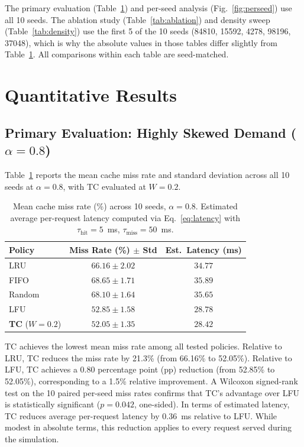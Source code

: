 \documentclass[preprint,12pt]{elsarticle}
\begin{document}
	The primary evaluation (Table~\ref{tab:main}) and per-seed analysis (Fig.~\ref{fig:perseed}) use all 10 seeds. The ablation study (Table~\ref{tab:ablation}) and density sweep (Table~\ref{tab:density}) use the first 5 of the 10 seeds (84810, 15592, 4278, 98196, 37048), which is why the absolute values in those tables differ slightly from Table~\ref{tab:main}. All comparisons within each table are seed-matched.
	
	\section{Quantitative Results}
	\label{sec:results}
	
	\subsection{Primary Evaluation: Highly Skewed Demand ($\alpha = 0.8$)}
	\label{sec:primary}
	
	Table~\ref{tab:main} reports the mean cache miss rate and standard deviation across all 10 seeds at $\alpha = 0.8$, with TC evaluated at $W = 0.2$.
	
	\begin{table}[t]
		\centering
		\renewcommand{\arraystretch}{1.1}
		\caption{Mean cache miss rate (\%) across 10 seeds, $\alpha = 0.8$. Estimated average per-request latency computed via Eq.~\ref{eq:latency} with $\tau_\text{hit} = 5$~ms, $\tau_\text{miss} = 50$~ms.}
		\label{tab:main}
		\begin{tabular}{lcc}
			\toprule
			\textbf{Policy} & \textbf{Miss Rate (\%) $\pm$ Std} & \textbf{Est.\ Latency (ms)} \\
			\midrule
			LRU & $66.16 \pm 2.02$ & $34.77$ \\
			FIFO & $68.65 \pm 1.71$ & $35.89$ \\
			Random & $68.10 \pm 1.64$ & $35.65$ \\
			LFU & $52.85 \pm 1.58$ & $28.78$ \\
			\textbf{TC} ($W=0.2$) & $\mathbf{52.05 \pm 1.35}$ & $\mathbf{28.42}$ \\
			\bottomrule
		\end{tabular}
	\end{table}
	
	TC achieves the lowest mean miss rate among all tested policies. Relative to LRU, TC reduces the miss rate by 21.3\% (from 66.16\% to 52.05\%). Relative to LFU, TC achieves a 0.80 percentage point (pp) reduction (from 52.85\% to 52.05\%), corresponding to a 1.5\% relative improvement. A Wilcoxon signed-rank test on the 10 paired per-seed miss rates confirms that TC's advantage over LFU is statistically significant ($p = 0.042$, one-sided). In terms of estimated latency, TC reduces average per-request latency by 0.36~ms relative to LFU. While modest in absolute terms, this reduction applies to every request served during the simulation.
	
\end{document}
